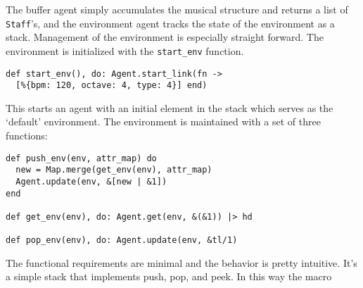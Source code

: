 \documentclass[11pt]{article}
\begin{document}
The buffer agent simply accumulates the musical structure and
returns a list of \verb~Staff~'s, and the environment agent tracks the
state of the environment as a stack. Management of the environment
is especially straight forward. The environment is initialized with
the \verb~start_env~ function.
\begin{verbatim}
def start_env(), do: Agent.start_link(fn -> 
  [%{bpm: 120, octave: 4, type: 4}] end)
\end{verbatim}
This starts an agent with an initial element in the stack which
serves as the `default' environment. The environment is maintained
with a set of three functions:
\begin{verbatim}
def push_env(env, attr_map) do
  new = Map.merge(get_env(env), attr_map)
  Agent.update(env, &[new | &1])
end

def get_env(env), do: Agent.get(env, &(&1)) |> hd

def pop_env(env), do: Agent.update(env, &tl/1)
\end{verbatim}
The functional requirements are minimal and the behavior
is pretty intuitive. It's a simple stack that implements push, pop,
and peek. In this way the macro 
\end{document}
